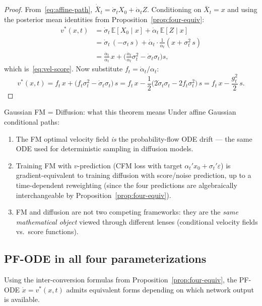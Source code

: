 \documentclass[11pt]{article}
\newcommand{\E}{\mathbb{E}}
\theoremstyle{definition}
\theoremstyle{remark}
\begin{document}
\begin{proof}
From~\eqref{eq:affine-path}, $\dot{\bar{X}}_t = \dot\sigma_t X_0 + \dot\alpha_t Z$.
Conditioning on $\bar{X}_t = x$ and using the posterior mean identities from Proposition~\ref{prop:four-equiv}:
\begin{align*}
v^*(x,t) &= \dot\sigma_t\,\E[X_0\mid x] + \dot\alpha_t\,\E[Z\mid x] \\
&= \dot\sigma_t\,(-\sigma_t\,s) + \dot\alpha_t\cdot\frac{1}{\alpha_t}(x + \sigma_t^2\,s) \\
&= \frac{\dot\alpha_t}{\alpha_t}\,x + \Big(\frac{\dot\alpha_t}{\alpha_t}\sigma_t^2 - \dot\sigma_t\sigma_t\Big)s,
\end{align*}
which is~\eqref{eq:vel-score}.
Now substitute $f_t = \dot\alpha_t/\alpha_t$:
\[
v^*(x,t) = f_t\,x + \big(f_t\sigma_t^2 - \dot\sigma_t\sigma_t\big)\,s = f_t\,x - \frac{1}{2}\big(2\dot\sigma_t\sigma_t - 2f_t\sigma_t^2\big)\,s = f_t\,x - \frac{g_t^2}{2}\,s.
\]
\end{proof}

\begin{resultbox}{Gaussian FM = Diffusion: what this theorem means}
Under affine Gaussian conditional paths:
\begin{enumerate}[nosep]
\item The FM optimal velocity field \emph{is} the probability-flow ODE drift --- the same ODE used for deterministic sampling in diffusion models.
\item Training FM with $v$-prediction (CFM loss with target $\alpha_t' x_0 + \sigma_t'\varepsilon$) is gradient-equivalent to training diffusion with score/noise prediction, up to a time-dependent reweighting (since the four predictions are algebraically interchangeable by Proposition~\ref{prop:four-equiv}).
\item FM and diffusion are not two competing frameworks: they are the \emph{same mathematical object} viewed through different lenses (conditional velocity fields vs.\ score functions).
\end{enumerate}
\end{resultbox}

\subsection{PF-ODE in all four parameterizations}

Using the inter-conversion formulas from Proposition~\ref{prop:four-equiv}, the PF-ODE $\dot{x} = v^*(x,t)$ admits equivalent forms depending on which network output is available.
\end{document}
